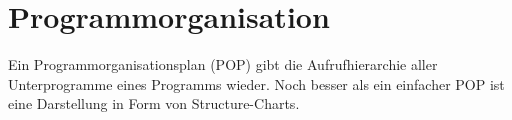 \section{Programmorganisation}
\label{sec:programmierhandbuch:organisation}

Ein Programmorganisationsplan (POP) gibt die Aufrufhierarchie aller Unterprogramme eines Programms wieder. Noch besser als ein einfacher POP ist eine Darstellung in Form von Structure-Charts.
